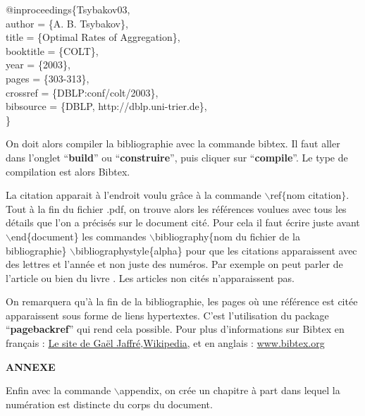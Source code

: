 \documentclass[11pt]{article}
\theoremstyle{remark}
\theoremstyle{definition}
\begin{document}
\noindent @inproceedings\{Tsybakov03, \\
  author    = \{A. B. Tsybakov\}, \\
  title     = \{Optimal Rates of Aggregation\}, \\
  booktitle = \{COLT\}, \\
  year      = \{2003\}, \\
  pages     = \{303-313\}, \\
  crossref  = \{DBLP:conf/colt/2003\}, \\
  bibsource = \{DBLP, http://dblp.uni-trier.de\}, \\
\}

On doit alors compiler la bibliographie avec la commande bibtex. Il faut aller dans l'onglet ``\textbf{build}'' ou ``\textbf{construire}'', puis cliquer sur ``\textbf{compile}''. Le type de compilation est alors Bibtex.\medskip

La citation apparait à l'endroit voulu grâce à la commande  $\backslash$ref$\{$nom citation$\}$. Tout à la fin du fichier .pdf, on trouve alors  les références voulues avec tous les détails que l'on a précisés sur le document cité. Pour cela il faut  écrire juste avant $\backslash$end\{document\} les commandes $\backslash$bibliography\{nom du fichier de la bibliographie\}
$\backslash$bibliographystyle\{alpha\} pour que les citations apparaissent avec des lettres et l'année et non juste des numéros. Par exemple on peut parler de l'article \cite{Tsybakov03} ou bien du livre \cite{Catoni04}. Les articles non cités n'apparaissent pas. \medskip

On remarquera qu'à la fin de la bibliographie, les pages où une référence est citée apparaissent sous forme de liens hypertextes. C'est l'utilisation du package ``\textbf{pagebackref}'' qui rend cela possible.
Pour plus d'informations sur Bibtex en français : \href{http://www.irit.fr/~Gael.Jaffre/LOGICIELS/LATEX_BIBTEX/bibtex1.html}{Le site de Gaël Jaffré},\href{http://fr.wikipedia.org/wiki/BibTeX}{Wikipedia},  et en anglais :  \href{http://www.bibtex.org/}{www.bibtex.org}



\newpage
\appendix
\begin{center}
    {\bf ANNEXE}
  \end{center}
Enfin avec la commande $\backslash$appendix, on crée un chapitre à part dans lequel la numération est distincte du corps du document.
\end{document}
